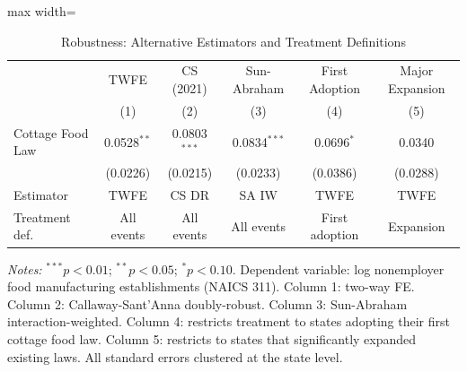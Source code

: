 \begin{table}[htbp]
\centering
\caption{Robustness: Alternative Estimators and Treatment Definitions}
\label{tab:robustness}
\begin{adjustbox}{max width=\textwidth}
\begin{tabular}{lccccc}
\hline\hline
 & TWFE & CS (2021) & Sun-Abraham & First Adoption & Major Expansion \\
 & (1) & (2) & (3) & (4) & (5) \\
\hline
Cottage Food Law & 0.0528$^{**}$ & 0.0803$^{***}$ & 0.0834$^{***}$ & 0.0696$^{*}$ & 0.0340 \\
 & (0.0226) & (0.0215) & (0.0233) & (0.0386) & (0.0288) \\
\hline
Estimator & TWFE & CS DR & SA IW & TWFE & TWFE \\
Treatment def. & All events & All events & All events & First adoption & Expansion \\
\hline\hline
\end{tabular}
\end{adjustbox}
\begin{tablenotes}[flushleft]\small
\item \textit{Notes:} $^{***}p<0.01$; $^{**}p<0.05$; $^{*}p<0.10$. Dependent variable: log nonemployer food manufacturing establishments (NAICS 311). Column 1: two-way FE. Column 2: Callaway-Sant'Anna doubly-robust. Column 3: Sun-Abraham interaction-weighted. Column 4: restricts treatment to states adopting their first cottage food law. Column 5: restricts to states that significantly expanded existing laws. All standard errors clustered at the state level.
\end{tablenotes}
\end{table}
